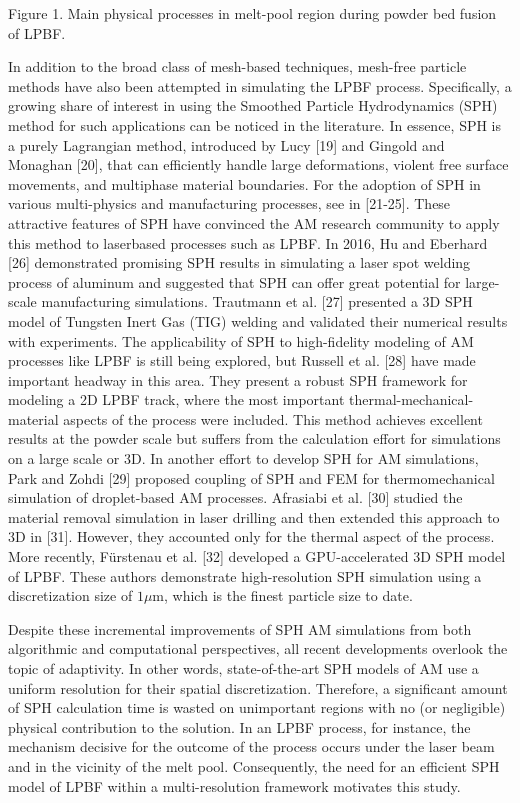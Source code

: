 \documentclass[10pt]{article}
\begin{document}
Figure 1. Main physical processes in melt-pool region during powder bed fusion of LPBF.

In addition to the broad class of mesh-based techniques, mesh-free particle methods have also been attempted in simulating the LPBF process. Specifically, a growing share of interest in using the Smoothed Particle Hydrodynamics (SPH) method for such applications can be noticed in the literature. In essence, SPH is a purely Lagrangian method, introduced by Lucy [19] and Gingold and Monaghan [20], that can efficiently handle large deformations, violent free surface movements, and multiphase material boundaries. For the adoption of SPH in various multi-physics and manufacturing processes, see in [21-25]. These attractive features of SPH have convinced the AM research community to apply this method to laserbased processes such as LPBF. In 2016, Hu and Eberhard [26] demonstrated promising SPH results in simulating a laser spot welding process of aluminum and suggested that SPH can offer great potential for large-scale manufacturing simulations. Trautmann et al. [27] presented a 3D SPH model of Tungsten Inert Gas (TIG) welding and validated their numerical results with experiments. The applicability of SPH to high-fidelity modeling of AM processes like LPBF is still being explored, but Russell et al. [28] have made important headway in this area. They present a robust SPH framework for modeling a 2D LPBF track, where the most important thermal-mechanical-material aspects of the process were included. This method achieves excellent results at the powder scale but suffers from the calculation effort for simulations on a large scale or 3D. In another effort to develop SPH for AM simulations, Park and Zohdi [29] proposed coupling of SPH and FEM for thermomechanical simulation of droplet-based AM processes. Afrasiabi et al. [30] studied the material removal simulation in laser drilling and then extended this approach to 3D in [31]. However, they accounted only for the thermal aspect of the process. More recently, Fürstenau et al. [32] developed a GPU-accelerated 3D SPH model of LPBF. These authors demonstrate high-resolution SPH simulation using a discretization size of $1 \mu \mathrm{m}$, which is the finest particle size to date.

Despite these incremental improvements of SPH AM simulations from both algorithmic and computational perspectives, all recent developments overlook the topic of adaptivity. In other words, state-of-the-art SPH models of AM use a uniform resolution for their spatial discretization. Therefore, a significant amount of SPH calculation time is wasted on unimportant regions with no (or negligible) physical contribution to the solution. In an LPBF process, for instance, the mechanism decisive for the outcome of the process occurs under the laser beam and in the vicinity of the melt pool. Consequently, the need for an efficient SPH model of LPBF within a multi-resolution framework motivates this study.
\end{document}
